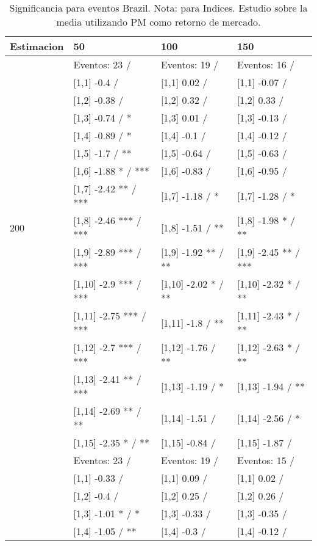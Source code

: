 \begin{table}

\caption{Significancia para eventos Brazil. Nota: para Indices. Estudio sobre la media utilizando PM como retorno de mercado.}
\centering
\begin{tabular}[t]{llll}
\toprule
Estimacion & 50 & 100 & 150\\
\midrule
 & Eventos:  23 / & Eventos:  19 / & Eventos:  16 /\\
 & {}[1,1] -0.4  / & {}[1,1] 0.02  / & {}[1,1] -0.07  /\\
 & {}[1,2] -0.38  / & {}[1,2] 0.32  / & {}[1,2] 0.33  /\\
 & {}[1,3] -0.74  / * & {}[1,3] 0.01  / & {}[1,3] -0.13  /\\
 & {}[1,4] -0.89  / * & {}[1,4] -0.1  / & {}[1,4] -0.12  /\\
\addlinespace
 & {}[1,5] -1.7  / ** & {}[1,5] -0.64  / & {}[1,5] -0.63  /\\
 & {}[1,6] -1.88 * / *** & {}[1,6] -0.83  / & {}[1,6] -0.95  /\\
 & {}[1,7] -2.42 ** / *** & {}[1,7] -1.18  / * & {}[1,7] -1.28  / *\\
200 & {}[1,8] -2.46 *** / *** & {}[1,8] -1.51  / ** & {}[1,8] -1.98 * / **\\
 & {}[1,9] -2.89 *** / *** & {}[1,9] -1.92 ** / ** & {}[1,9] -2.45 ** / ***\\
\addlinespace
 & {}[1,10] -2.9 *** / *** & {}[1,10] -2.02 * / ** & {}[1,10] -2.32 * / **\\
 & {}[1,11] -2.75 *** / *** & {}[1,11] -1.8  / ** & {}[1,11] -2.43 * / **\\
 & {}[1,12] -2.7 *** / *** & {}[1,12] -1.76  / ** & {}[1,12] -2.63 * / **\\
 & {}[1,13] -2.41 ** / *** & {}[1,13] -1.19  / * & {}[1,13] -1.94  / **\\
 & {}[1,14] -2.69 ** / ** & {}[1,14] -1.51  / & {}[1,14] -2.56  / *\\
\addlinespace
 & {}[1,15] -2.35 * / ** & {}[1,15] -0.84  / & {}[1,15] -1.87  /\\
 & Eventos:  23 / & Eventos:  19 / & Eventos:  15 /\\
 & {}[1,1] -0.33  / & {}[1,1] 0.09  / & {}[1,1] 0.02  /\\
 & {}[1,2] -0.4  / & {}[1,2] 0.25  / & {}[1,2] 0.26  /\\
 & {}[1,3] -1.01 * / * & {}[1,3] -0.33  / & {}[1,3] -0.35  /\\
\addlinespace
 & {}[1,4] -1.05  / ** & {}[1,4] -0.3  / & {}[1,4] -0.12  /\\

\end{tabular}
\end{table}
